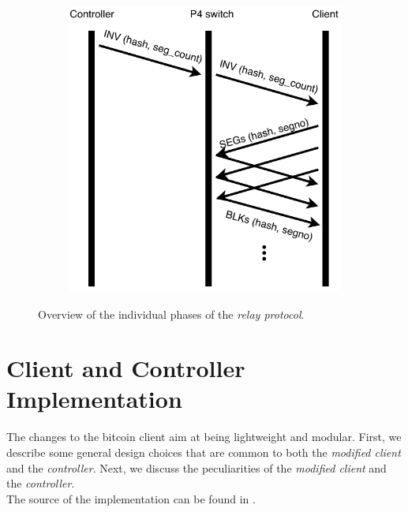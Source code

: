 \begin{figure}[!bt]
\begin{center}
\begin{subfigure}[b]{0.32\textwidth}
  \label{figure:upd}
\end{subfigure}
\begin{subfigure}[b]{0.32\textwidth}
	\includegraphics[width=\textwidth]{Figures/INV.pdf}
  \label{figure:inv}
\end{subfigure}
\caption[Overview of the individual phases of the relay protocol.]{Overview of the individual phases of the \textit{relay protocol}.}
\label{figure:messagingProtocol}
\end{center}
\end{figure}




\section{Client and Controller Implementation  \label{sec:design:design}}
The changes to the bitcoin client aim at being lightweight and modular. First, we describe some general design choices that are common to both the \textit{modified client} and the \textit{controller}. Next, we discuss the peculiarities of the \textit{modified client} and the \textit{controller}.\\
The source of the implementation can be found in \cite{bitcoinFork}.

